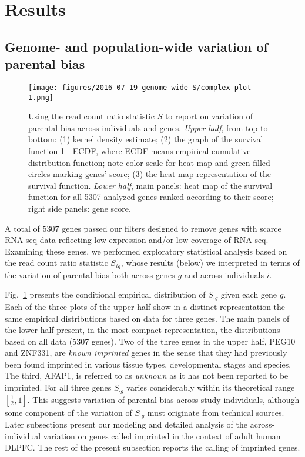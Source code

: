\documentclass[letterpaper]{article}
\begin{document}
\section{Results}

\subsection{Genome- and population-wide variation of parental bias}

\begin{figure}
\begin{center}
\texttt{[image: figures/2016-07-19-genome-wide-S/complex-plot-1.png]}
\end{center}
\caption{
Using the read count ratio statistic \(S\) to report on variation of parental
bias across individuals and genes.  \emph{Upper half}, from top to bottom: (1)
kernel density estimate; (2) the graph of the survival function 1 - ECDF,
where ECDF means empirical cumulative distribution function; note color scale
for heat map and green filled circles marking genes' score; (3) the heat map
representation of the survival function.  \emph{Lower half}, main panels: heat
map of the survival function for all 5307 analyzed genes ranked according to
their score; right side panels: gene score.
}
\label{fig:ranking-genes}
\end{figure}

A total of \(5307\) genes passed our filters designed to remove genes with
scarce RNA-seq data reflecting low expression and/or low coverage of RNA-seq.
Examining these genes, we performed exploratory statistical analysis based on
the read count ratio statistic \(S_{ig}\), whose results (below) we
interpreted in terms of the variation of parental bias both across genes \(g\)
and across individuals \(i\).

Fig.~\ref{fig:ranking-genes} presents the conditional empirical distribution
of \(S_{\cdot g}\) given each gene \(g\).  Each of the three plots of the
upper half show in a distinct representation the same empirical distributions
based on data for three genes.  The main panels of the lower half present, in
the most compact representation, the distributions based on all data (5307
genes).  Two of the three genes in the upper half, PEG10 and ZNF331, are
\emph{known imprinted} genes in the sense that they had previously been found
imprinted in various tissue types, developmental stages and species.  The
third, AFAP1, is referred to as \emph{unknown} as it has not been reported to
be imprinted.  For all three genes \(S_{\cdot g}\) varies considerably within
its theoretical range \([\frac{1}{2}, 1]\).  This suggests variation of
parental bias across study individuals, although some component of the
variation of \(S_{\cdot g}\) must originate from technical sources.  Later
subsections present our modeling and detailed analysis of the
across-individual variation on genes called imprinted in the context of adult
human DLPFC.  The rest of the present subsection reports the calling of
imprinted genes.
\end{document}
